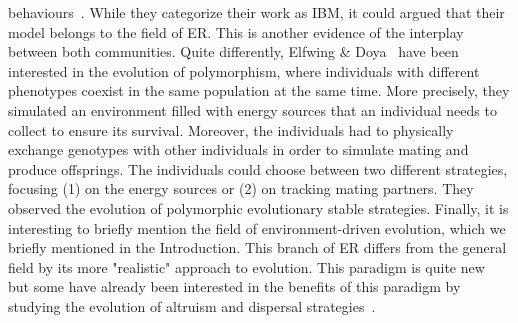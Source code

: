 behaviours~\parencite{Olson2013, Olson2013a, Haley2014}. While they categorize their work as IBM, it could argued that their model belongs to the field of ER. This is another evidence of the interplay between both communities. Quite differently, Elfwing \& Doya~\parencite{Elfwing2014a} have been interested in the evolution of polymorphism, where individuals with different phenotypes coexist in the same population at the same time. More precisely, they simulated an environment filled with energy sources that an individual needs to collect to ensure its survival. Moreover, the individuals had to physically exchange genotypes with other individuals in order to simulate mating and produce offsprings. The individuals could choose between two different strategies, focusing (1) on the energy sources or (2) on tracking mating partners. They observed the evolution of polymorphic evolutionary stable strategies. Finally, it is interesting to briefly mention the field of environment-driven evolution, which we briefly mentioned in the Introduction. This branch of ER differs from the general field by its more "realistic" approach to evolution. This paradigm is quite new~\parencite{Bredeche2010, Bredeche2012} but some have already been interested in the benefits of this paradigm by studying the evolution of altruism and dispersal strategies~\parencite{Montanier2011, Montanier2013}.

